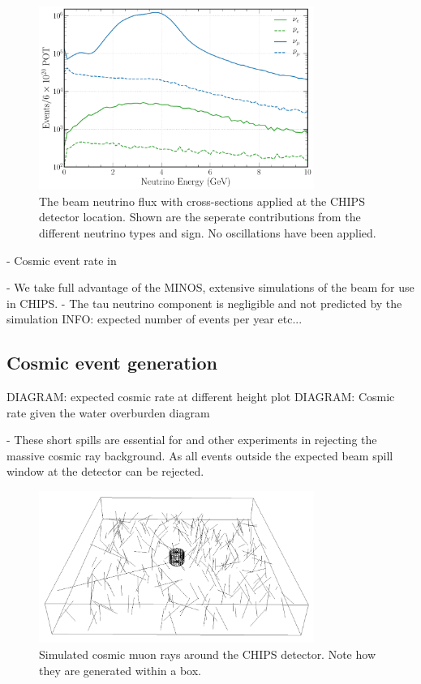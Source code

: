 \begin{figure} %
    \includegraphics[width=0.8\textwidth]{diagrams/4-chips/flux.pdf}
    \caption[\numi neutrino flux at CHIPS.]
    {The \numi beam neutrino flux with cross-sections applied at the CHIPS detector location. Shown
        are the seperate contributions from the different neutrino types and sign. No oscillations
        have been applied.}
    \label{fig:flux}
\end{figure}

- Cosmic event rate in \cite{son2013}

- We take full advantage of the MINOS, \nova extensive simulations of the \numi beam for use in
CHIPS.
- The tau neutrino component is negligible and not predicted by the simulation
INFO: expected number of events per year etc...

\subsection{Cosmic event generation} %
\label{sec:chips_monte_carlo_cosmic} %

DIAGRAM: expected cosmic rate at different height plot
DIAGRAM: Cosmic rate given the water overburden diagram

- These short spills are essential for \chips and other experiments in rejecting the massive
cosmic ray background. As all events outside the expected beam spill window at the detector can be
rejected.

\begin{figure} %
    \includegraphics[width=0.8\textwidth]{diagrams/4-chips/cosmics.png}
    \caption[Cosmic muon rays around the CHIPS detector]
    {Simulated cosmic muon rays around the CHIPS detector. Note how they are generated within a
        box.}
    \label{fig:cosmics}
\end{figure}

